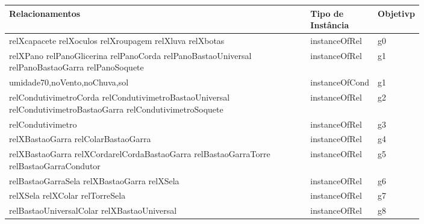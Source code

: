 \begin{table}[H]
\centering
{}
\begin{tabular}{|p{0.8\linewidth}|l|l|}
\hline
\textbf{Relacionamentos}																									& \textbf{Tipo de Instância}          & \textbf{Objetivp} \\ \hline
relXcapacete relXoculos relXroupagem relXluva relXbotas                                                                                                                                                                                                                                                                    & instanceOfRel              		 & g0         \\ \hline
relXPano relPanoGlicerina relPanoCorda relPanoBastaoUniversal relPanoBastaoGarra relPanoSoquete                             & instanceOfRel                       & g1         \\ \hline
umidade70,noVento,noChuva,sol 																								& instanceOfCond					  & g1        \\ \hline
relCondutivimetroCorda relCondutivimetroBastaoUniversal relCondutivimetroBastaoGarra relCondutivimetroSoquete               & instanceOfRel              		 & g2         \\ \hline
relCondutivimetro                                                                                                           & instanceOfRel              		 & g3         \\ \hline
relXBastaoGarra relColarBastaoGarra                                                                                         & instanceOfRel              		 & g4         \\ \hline
relXBastaoGarra relXCordarelCordaBastaoGarra relBastaoGarraTorre relBastaoGarraCondutor                                     & instanceOfRel              		 & g5         \\ \hline
relBastaoGarraSela relXBastaoGarra relXSela                                                                                 & instanceOfRel              		 & g6         \\ \hline
relXSela relXColar relTorreSela                                                                                             & instanceOfRel              		 & g7         \\ \hline
relBastaoUniversalColar relXBastaoUniversal                                                                                 & instanceOfRel              		 & g8         \\ \hline

\end{tabular}
\end{table}
